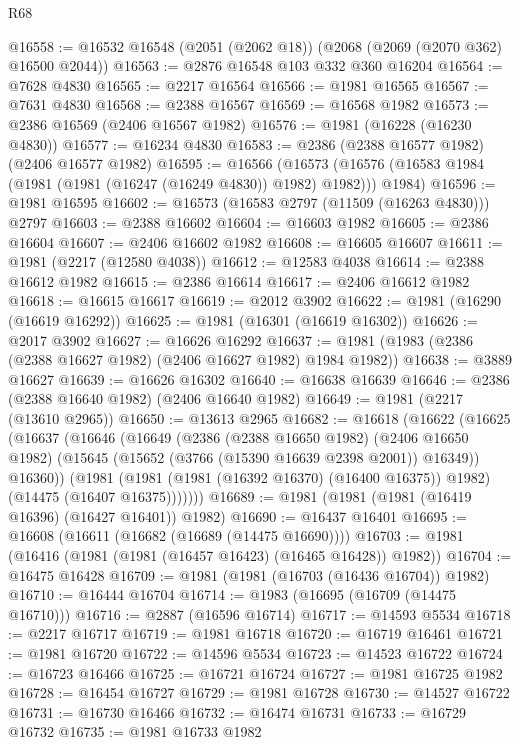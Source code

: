 \begin{lexlean}{R68}
\begin{coremodule}
@16558 := @16532 @16548 (@2051 (@2062 @18)) (@2068 (@2069 (@2070 @362) @16500 @2044))
@16563 := @2876 @16548 @103 @332 @360 @16204
@16564 := @7628 @4830
@16565 := @2217 @16564
@16566 := @1981 @16565
@16567 := @7631 @4830
@16568 := @2388 @16567
@16569 := @16568 @1982
@16573 := @2386 @16569 (@2406 @16567 @1982)
@16576 := @1981 (@16228 (@16230 @4830))
@16577 := @16234 @4830
@16583 := @2386 (@2388 @16577 @1982) (@2406 @16577 @1982)
@16595 := @16566
    (@16573 (@16576 (@16583 @1984 (@1981 (@1981 (@16247 (@16249 @4830)) @1982) @1982))) @1984)
@16596 := @1981 @16595
@16602 := @16573 (@16583 @2797 (@11509 (@16263 @4830))) @2797
@16603 := @2388 @16602
@16604 := @16603 @1982
@16605 := @2386 @16604
@16607 := @2406 @16602 @1982
@16608 := @16605 @16607
@16611 := @1981 (@2217 (@12580 @4038))
@16612 := @12583 @4038
@16614 := @2388 @16612 @1982
@16615 := @2386 @16614
@16617 := @2406 @16612 @1982
@16618 := @16615 @16617
@16619 := @2012 @3902
@16622 := @1981 (@16290 (@16619 @16292))
@16625 := @1981 (@16301 (@16619 @16302))
@16626 := @2017 @3902
@16627 := @16626 @16292
@16637 := @1981 (@1983 (@2386 (@2388 @16627 @1982) (@2406 @16627 @1982) @1984 @1982))
@16638 := @3889 @16627
@16639 := @16626 @16302
@16640 := @16638 @16639
@16646 := @2386 (@2388 @16640 @1982) (@2406 @16640 @1982)
@16649 := @1981 (@2217 (@13610 @2965))
@16650 := @13613 @2965
@16682 := @16618
    (@16622
      (@16625
        (@16637
          (@16646
            (@16649
              (@2386
                (@2388 @16650 @1982)
                (@2406 @16650 @1982)
                (@15645 (@15652 (@3766 (@15390 @16639 @2398 @2001)) @16349))
                @16360))
            (@1981
              (@1981 (@1981 (@16392 @16370) (@16400 @16375)) @1982)
              (@14475 (@16407 @16375)))))))
@16689 := @1981 (@1981 (@1981 (@16419 @16396) (@16427 @16401)) @1982)
@16690 := @16437 @16401
@16695 := @16608 (@16611 (@16682 (@16689 (@14475 @16690))))
@16703 := @1981 (@16416 (@1981 (@1981 (@16457 @16423) (@16465 @16428)) @1982))
@16704 := @16475 @16428
@16709 := @1981 (@1981 (@16703 (@16436 @16704)) @1982)
@16710 := @16444 @16704
@16714 := @1983 (@16695 (@16709 (@14475 @16710)))
@16716 := @2887 (@16596 @16714)
@16717 := @14593 @5534
@16718 := @2217 @16717
@16719 := @1981 @16718
@16720 := @16719 @16461
@16721 := @1981 @16720
@16722 := @14596 @5534
@16723 := @14523 @16722
@16724 := @16723 @16466
@16725 := @16721 @16724
@16727 := @1981 @16725 @1982
@16728 := @16454 @16727
@16729 := @1981 @16728
@16730 := @14527 @16722
@16731 := @16730 @16466
@16732 := @16474 @16731
@16733 := @16729 @16732
@16735 := @1981 @16733 @1982

\end{coremodule}
\end{lexlean}
